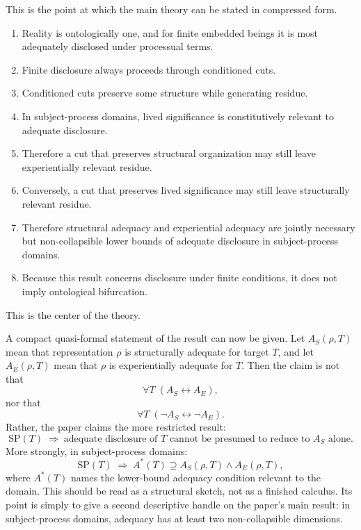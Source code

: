 \documentclass[11pt]{article}
\begin{document}
This is the point at which the main theory can be stated in compressed form.

\begin{enumerate}
    \item Reality is ontologically one, and for finite embedded beings it is most adequately disclosed under processual terms.
    \item Finite disclosure always proceeds through conditioned cuts.
    \item Conditioned cuts preserve some structure while generating residue.
    \item In subject-process domains, lived significance is constitutively relevant to adequate disclosure.
    \item Therefore a cut that preserves structural organization may still leave experientially relevant residue.
    \item Conversely, a cut that preserves lived significance may still leave structurally relevant residue.
    \item Therefore structural adequacy and experiential adequacy are jointly necessary but non-collapsible lower bounds of adequate disclosure in subject-process domains.
    \item Because this result concerns disclosure under finite conditions, it does not imply ontological bifurcation.
\end{enumerate}

This is the center of the theory.

A compact quasi-formal statement of the result can now be given. Let \(A_S(\rho,T)\) mean that representation \(\rho\) is structurally adequate for target \(T\), and let \(A_E(\rho,T)\) mean that \(\rho\) is experientially adequate for \(T\). Then the claim is not that
\[
\forall T \; (A_S \leftrightarrow A_E),
\]
nor that
\[
\forall T \; (\neg A_S \leftrightarrow \neg A_E).
\]
Rather, the paper claims the more restricted result:
\[
\mathrm{SP}(T) \;\Rightarrow\; \text{adequate disclosure of } T \text{ cannot be presumed to reduce to } A_S \text{ alone}.
\]
More strongly, in subject-process domains:
\[
\mathrm{SP}(T) \;\Rightarrow\; A^{*}(T) \supseteq A_S(\rho,T)\wedge A_E(\rho,T),
\]
where \(A^{*}(T)\) names the lower-bound adequacy condition relevant to the domain. This should be read as a structural sketch, not as a finished calculus. Its point is simply to give a second descriptive handle on the paper's main result: in subject-process domains, adequacy has at least two non-collapsible dimensions.
\end{document}
